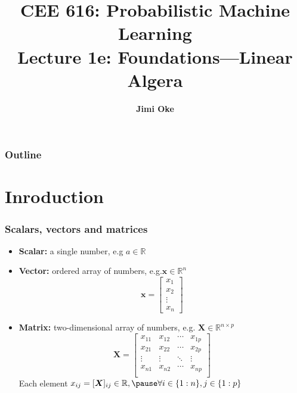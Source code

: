 \documentclass[smaller]{beamer}
\title[CEE 616 1e: Linear Algebra]{ {\normalsize CEE 616:  Probabilistic Machine Learning}
  \\ Lecture 1e: Foundations---Linear Algera}
\date[\ldate]{\footnotesize \ldate}
\author{{\bf Jimi Oke}}
\institute[UMass Amherst]{
  \begin{tikzpicture}[baseline=(current bounding box.center)]
    \node[anchor=base] at (-7,0) (its) {\texttt{[image: UMassEngineering\_vert]}} ;
  \end{tikzpicture}
}
\newcommand{\?}{\stackrel{?}{=}}
\newcommand{\mb}{\mathbb}
\begin{document}
\maketitle

\begin{frame}
  \frametitle{Outline}
  \tableofcontents
\end{frame}

\section{Inroduction}
\begin{frame}
  \frametitle{Scalars, vectors and matrices}\pause
  \begin{itemize}
  \item \textbf{Scalar:} a single number, e.g \pause $a \in \mathbb{R}$\pause
  \item \textbf{Vector:} ordered array of numbers, e.g.\pause $\bm x
    \in \mb{R}^n$ \pause
    \begin{equation*}
      \bm{x} = \begin{bmatrix} x_{1}\\ x_{2}\\ \vdots\\ x_{n} \end{bmatrix}
    \end{equation*}\pause
  \item \textbf{Matrix:} two-dimensional array of numbers, e.g. $\bm X \in \mathbb{R}^{n\times p} $
    \pause
    \begin{equation*}
      \bm X =
      \begin{bmatrix}
        x_{11} & x_{12} & \cdots & x_{1p} \\
        x_{21} & x_{22} & \cdots & x_{2p} \\
        \vdots & \vdots & \ddots & \vdots \\
        x_{n1} & x_{n2} & \cdots & x_{np} \\        
      \end{bmatrix}
    \end{equation*}
    \pause
    Each element $x_{ij} = [\bm X]_{ij}\in \mathbb{R}, \pause \forall i \in \{1:n\}, j \in \{1:p\}$
    
  \end{itemize}

\end{frame}
\end{document}
